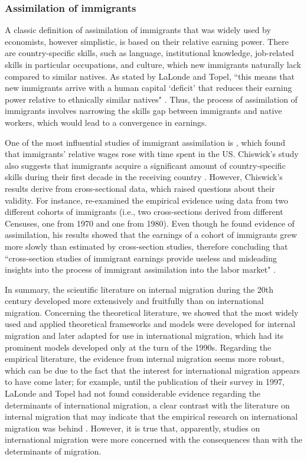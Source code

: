 \subsubsection{Assimilation of immigrants}

A classic definition of assimilation of immigrants that was widely used by economists, however simplistic, is based on their relative
earning power. There are country-specific skills, such as language, institutional knowledge, job-related skills in particular occupations, and culture, which new immigrants naturally lack compared to similar natives. As stated by LaLonde and Topel, ``this means that new immigrants arrive with a human capital `deficit' that reduces their earning power relative to ethnically similar natives" \citep[p. 828]{lalonde_economic_1997}. Thus, the process of assimilation of immigrants involves narrowing the skills gap  between immigrants and native workers, which would lead to a convergence in earnings. 

One of the most influential studies of immigrant assimilation is \cite{chiswick_effect_1978}, which found that immigrants' relative wages rose with time spent in the US. Chiswick's study also suggests that immigrants acquire a significant amount of country-specific skills during their first decade in the receiving country \citep{chiswick_effect_1978, borjas_assimilation_1985, lalonde_economic_1997}. However, Chiswick's results derive from cross-sectional data, which raised questions about their validity. For instance, \cite{borjas_assimilation_1985} re-examined the empirical evidence using data from two different cohorts of immigrants (i.e., two cross-sections derived from different Censuses, one from 1970 and one from 1980). Even though he found evidence of assimilation, his results showed that the earnings of a cohort of immigrants grew more slowly than estimated by cross-section studies, therefore concluding that ``cross-section studies of immigrant earnings provide useless and misleading insights into the process of immigrant assimilation into the labor market" \citep[p. 485]{borjas_assimilation_1985}.

In summary, the scientific literature on internal migration during the 20th century developed more extensively and fruitfully than on international migration. Concerning the theoretical literature, we showed that the most widely used and applied theoretical frameworks and models were developed for internal migration and later adapted for use in international migration, which had its prominent models developed only at the turn of the 1990s. Regarding the empirical literature, the evidence from internal migration seems more robust, which can be due to the fact that the interest for international migration appears to have come later; for example, until the publication of their survey in 1997, LaLonde and Topel had not found considerable evidence regarding the determinants of international migration, a clear contrast with the literature on internal migration that may indicate that the empirical research on international migration was behind \citep{lalonde_economic_1997}. However, it is true that, apparently, studies on international migration were more concerned with the consequences than with the determinants of migration.